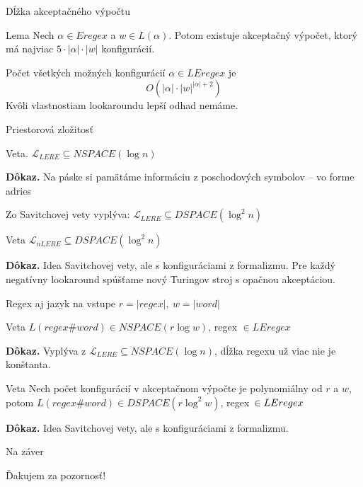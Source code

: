 \documentclass[mathserif]{beamer}
\def\e{Eregex}
\def\le{LEregex}
\def\lel{\mathscr{L}_{LERE}}
\def\nlel{\mathscr{L}_{nLERE}}
\begin{document}
\begin{frame}{Dĺžka akceptačného výpočtu}
\begin{block}{Lema}
Nech $\alpha \in \e$ a $w \in L(\alpha)$. Potom existuje akceptačný výpočet, ktorý má najviac $5\cdot|\alpha|\cdot|w|$ konfigurácií.
\end{block}

\vspace{20pt}
Počet všetkých možných konfigurácií $\alpha\in\le$ je $$O(|\alpha|\cdot|w|^{|\alpha|+2})$$
Kvôli vlastnostiam lookaroundu lepší odhad nemáme.
\end{frame}

\begin{frame}{Priestorová zložitosť}
\begin{block}{Veta.}
$\lel \subseteq NSPACE(\log n)$
\end{block}
\textbf{Dôkaz.} Na páske si pamätáme informáciu z poschodových symbolov -- vo forme adries

\vspace{10pt}
Zo Savitchovej vety vyplýva: $\lel \subseteq DSPACE(\log^2 n)$
\begin{block}{Veta}
$\nlel \subseteq DSPACE(\log^2 n)$
\end{block}
\textbf{Dôkaz.} Idea Savitchovej vety, ale s konfiguráciami z formalizmu. Pre každý negatívny lookaround spúšťame nový Turingov stroj s opačnou akceptáciou.
\end{frame}

\begin{frame}{Regex aj jazyk na vstupe}
$r=|regex|,~w=|word|$
\begin{block}{Veta}
$L(regex\#word) \in NSPACE(r\log w)$, regex $\in \le$
\end{block}
\textbf{Dôkaz.} Vyplýva z $\lel \subseteq NSPACE(\log n)$, dĺžka regexu už viac nie je konštanta.
\begin{block}{Veta}
Nech počet konfigurácií v akceptačnom výpočte je polynomiálny od $r$ a $w$, potom
$L(regex\#word) \in DSPACE(r\log^2 w)$, regex~$\in \nobreak\le$
\end{block}
\textbf{Dôkaz.} Idea Savitchovej vety, ale s konfiguráciami z formalizmu.
\end{frame}

\begin{frame}{Na záver}
\begin{alertblock}{}
\begin{center}
\vspace{10pt}
\large{Ďakujem za pozornosť!}
\vspace{10pt}
\end{center}
\end{alertblock}
\end{frame}
\end{document}
